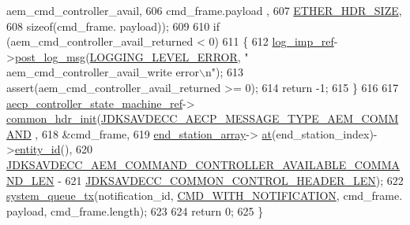 \begin{DoxyCode}
      aem\_cmd\_controller\_avail,
606                                                                                           cmd\_frame.payload
      ,
607                                                                                           
      \hyperlink{namespaceavdecc__lib_a6c827b1a0d973e18119c5e3da518e65ca9512ad9b34302ba7048d88197e0a2dc0}{ETHER\_HDR\_SIZE},
608                                                                                           \textcolor{keyword}{sizeof}(cmd\_frame.
      payload));
609 
610     \textcolor{keywordflow}{if} (aem\_cmd\_controller\_avail\_returned < 0)
611     \{
612         \hyperlink{namespaceavdecc__lib_acbe3e2a96ae6524943ca532c87a28529}{log\_imp\_ref}->\hyperlink{classavdecc__lib_1_1log_a68139a6297697e4ccebf36ccfd02e44a}{post\_log\_msg}(\hyperlink{namespaceavdecc__lib_a501055c431e6872ef46f252ad13f85cdaf2c4481208273451a6f5c7bb9770ec8a}{LOGGING\_LEVEL\_ERROR}, \textcolor{stringliteral}{"
      aem\_cmd\_controller\_avail\_write error\(\backslash\)n"});
613         assert(aem\_cmd\_controller\_avail\_returned >= 0);
614         \textcolor{keywordflow}{return} -1;
615     \}
616 
617     \hyperlink{namespaceavdecc__lib_a0b1b5aea3c0490f77cbfd9178af5be22}{aecp\_controller\_state\_machine\_ref}->
      \hyperlink{classavdecc__lib_1_1aecp__controller__state__machine_aafc737d7ed17a62fed9df6528f18d3ec}{common\_hdr\_init}(\hyperlink{group__aecp__message__type_ga4625ce189cc209f42deb0629f48faf69}{JDKSAVDECC\_AECP\_MESSAGE\_TYPE\_AEM\_COMMAND}
      ,
618                                                        &cmd\_frame,
619                                                        \hyperlink{classavdecc__lib_1_1controller__imp_a17c6518dbb728acdcd1c4e78d7bc1c5a}{end\_station\_array}->
      \hyperlink{classavdecc__lib_1_1end__stations_a8b2053474417f106d063017c5b60bad2}{at}(end\_station\_index)->\hyperlink{classavdecc__lib_1_1end__station__imp_a363b6c9664a0d701def9b17863e20ad3}{entity\_id}(),
620                                                        
      \hyperlink{group__command__controller__available_gaf4a8b6740c88a95c806d61c62172648b}{JDKSAVDECC\_AEM\_COMMAND\_CONTROLLER\_AVAILABLE\_COMMAND\_LEN}
       -
621                                                            
      \hyperlink{group__jdksavdecc__avtp__common__control__header_gaae84052886fb1bb42f3bc5f85b741dff}{JDKSAVDECC\_COMMON\_CONTROL\_HEADER\_LEN});
622     \hyperlink{namespaceavdecc__lib_a6dd511685627c0865a3442b539a4e8e9}{system\_queue\_tx}(notification\_id, \hyperlink{namespaceavdecc__lib_aabcadff06aa62be0ce47bc0646823604aba48b8a017e06fb240b650cdea965178}{CMD\_WITH\_NOTIFICATION}, cmd\_frame.
      payload, cmd\_frame.length);
623 
624     \textcolor{keywordflow}{return} 0;
625 \}
\end{DoxyCode}


